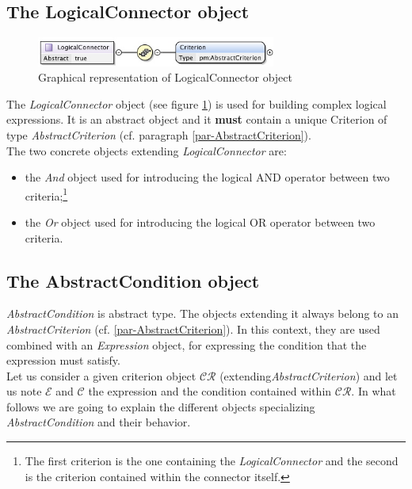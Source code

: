 \documentclass[a4paper,11pt] {ivoa}
\begin{document}
\subsection{The LogicalConnector object}\label{par-LogicalConnector}
\begin{figure}[htbp]
\begin{center}
\includegraphics[width=0.7\textwidth]{pictures/LogicalConnector.jpg} 
\caption{Graphical representation of LogicalConnector object}
\label{Pic-LogicalConnector}
\end{center}
\end{figure}
The {\it LogicalConnector} object (see figure \ref{Pic-LogicalConnector}) is used for building
complex logical expressions. It is an abstract object and it {\bf must} contain a unique Criterion
of type {\it AbstractCriterion} (cf. paragraph \ref{par-AbstractCriterion}).\\
The two concrete objects extending {\it LogicalConnector} are:
\begin{itemize}
\item the {\it And} object used for introducing the logical AND operator between two
criteria;\footnote{The first criterion is the one containing the {\it LogicalConnector} and the
second is the criterion contained within the connector itself.}
\item the {\it Or} object used for introducing the logical OR operator between two criteria.
\end{itemize}

\subsection{The AbstractCondition object}\label{par-ConditionType}
{\it AbstractCondition} is abstract type. The objects extending it always belong to an  {\it 
AbstractCriterion} (cf. \ref{par-AbstractCriterion}). In this context, they are used combined with
an {\it Expression} object, for expressing the condition that the expression must satisfy.\\
Let us consider a given criterion object $\mathcal{CR}$ (extending{\it AbstractCriterion})  and let
us note $\mathcal E$ and $\mathcal C$ the expression and the condition contained within
$\mathcal{CR}$.
In what follows we are going to explain the different objects specializing  {\it AbstractCondition}
and their behavior.
\end{document}
